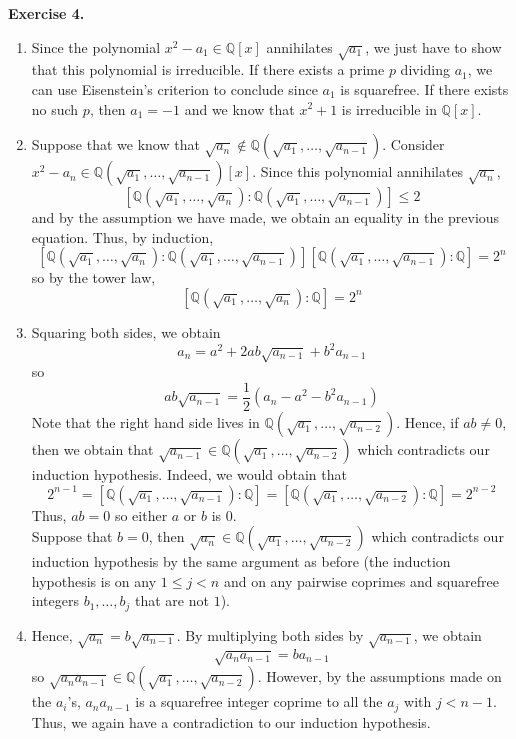 \documentclass[12pt,a4paper]{article}
\newcommand{\Q}{\mathbb{Q}}
\begin{document}
\noindent
\textbf{Exercise 4.}
\begin{enumerate}
	\item Since the polynomial $x^2 - a_1 \in \Q[x]$ annihilates $\sqrt{a_1}$, we just have to show that this polynomial is irreducible. If there exists a prime $p$ dividing $a_1$, we can use Eisenstein's criterion to conclude since $a_1$ is squarefree. If there exists no such $p$, then $a_1 = -1$ and we know that $x^2 + 1$ is irreducible in $\Q[x]$.
	
	\item Suppose that we know that $\sqrt{a_n} \notin \Q(\sqrt{a_1}, \dots, \sqrt{a_{n - 1}})$. Consider $x^2 - a_n \in \Q(\sqrt{a_1}, \dots, \sqrt{a_{n - 1}})[x]$. Since this polynomial annihilates $\sqrt{a_n}$, \[ [\Q(\sqrt{a_1}, \dots, \sqrt{a_n}) : \Q(\sqrt{a_1}, \dots, \sqrt{a_{n - 1}})] \leq 2 \] and by the assumption we have made, we obtain an equality in the previous equation. Thus, by induction, \[ [\Q(\sqrt{a_1}, \dots, \sqrt{a_n}) : \Q(\sqrt{a_1}, \dots, \sqrt{a_{n - 1}})][\Q(\sqrt{a_1}, \dots, \sqrt{a_{n - 1}}) : \Q]  = 2^n \] so by the tower law, \[ [\Q(\sqrt{a_1}, \dots, \sqrt{a_n}) : \Q] = 2^n \]
	
	\item Squaring both sides, we obtain \[ a_n = a^2 + 2ab\sqrt{a_{n - 1}} + b^2a_{n - 1} \] so \[ ab\sqrt{a_{n - 1}} = \frac{1}{2}(a_n - a^2 - b^2a_{n - 1}) \] Note that the right hand side lives in $\Q(\sqrt{a_1}, \dots, \sqrt{a_{n - 2}})$. Hence, if $ab \neq 0$, then we obtain that $\sqrt{a_{n - 1}} \in\Q(\sqrt{a_1}, \dots, \sqrt{a_{n - 2}})$ which contradicts our induction hypothesis. Indeed, we would obtain that \[ 2^{n - 1} = [\Q(\sqrt{a_1}, \dots, \sqrt{a_{n - 1}}) : \Q] = [\Q(\sqrt{a_1}, \dots, \sqrt{a_{n - 2}}) : \Q] = 2^{n - 2} \] Thus, $ab = 0$ so either $a$ or $b$ is $0$. \\
	Suppose that $b = 0$, then $\sqrt{a_n} \in \Q(\sqrt{a_1}, \dots, \sqrt{a_{n - 2}})$ which contradicts our induction hypothesis by the same argument as before (the induction hypothesis is on any $1 \leq j < n$ and on any pairwise coprimes and squarefree integers $b_1, \dots, b_j$ that are not $1$).
	
	\item Hence, $\sqrt{a_n} = b\sqrt{a_{n - 1}}$. By multiplying both sides by $\sqrt{a_{n - 1}}$, we obtain \[ \sqrt{a_na_{n - 1}} = ba_{n - 1} \] so $\sqrt{a_na_{n - 1}} \in \Q(\sqrt{a_1}, \dots, \sqrt{a_{n - 2}})$. However, by the assumptions made on the $a_i$'s, $a_na_{n - 1}$ is a squarefree integer coprime to all the $a_j$ with $j < n - 1$. Thus, we again have a contradiction to our induction hypothesis.
	\end{enumerate}
\end{document}

